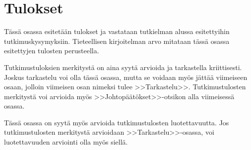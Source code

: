 \section{Tulokset}

Tässä osassa esitetään tulokset ja vastataan tutkielman alussa
esitettyihin tutkimuskysymyksiin. Tieteellisen kirjoitelman
arvo mitataan tässä osassa esitettyjen tulosten perusteella. 

Tutkimustuloksien merkitystä on aina syytä arvioida ja tarkastella
kriittisesti.  Joskus tarkastelu voi olla tässä osassa, mutta se
voidaan myös jättää viimeiseen osaan, jolloin viimeisen osan nimeksi
tulee >>Tarkastelu>>. Tutkimustulosten merkitystä voi arvioida myös
>>Johtopäätökset>>-otsikon alla viimeisessä osassa. 

Tässä osassa on syytä myös arvioida tutkimustulosten luotettavuutta.
Jos tutkimustulosten merkitystä arvioidaan >>Tarkastelu>>-osassa,
voi luotettavuuden arviointi olla myös siellä. 